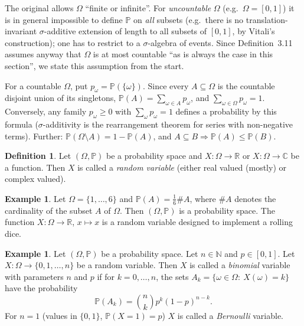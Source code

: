 \documentclass[11pt,a4paper]{article}
\numberwithin{equation}{section}
\newcommand{\N}{\mathbb{N}}
\newcommand{\R}{\mathbb{R}}
\newcommand{\C}{\mathbb{C}}
\newcommand{\PP}{\mathbb{P}}
\theoremstyle{plain}
\theoremstyle{definition}
\newtheorem{definition}[theorem]{Definition}
\newtheorem{example}[theorem]{Example}
\theoremstyle{plain}
\theoremstyle{definition}
\begin{document}
\begin{correction}[(Def.~3.1)]
The original allows $\Omega$ ``finite or infinite''. For \emph{uncountable} $\Omega$ (e.g.\
$\Omega=[0,1]$) it is in general impossible to define $\PP$ on \emph{all} subsets (e.g.\
there is no translation-invariant $\sigma$-additive extension of length to all subsets of
$[0,1]$, by Vitali's construction); one has to restrict to a $\sigma$-algebra of events.
Since Definition~3.11 assumes anyway that $\Omega$ is at most countable ``as is always the
case in this section'', we state this assumption from the start.
\end{correction}

\begin{addition}
For a countable $\Omega$, put $p_\omega=\PP(\{\omega\})$. Since every $A\subseteq\Omega$ is
the countable disjoint union of its singletons, $\PP(A)=\sum_{\omega\in A}p_\omega$, and
$\sum_{\omega\in\Omega}p_\omega=1$. Conversely, any family $p_\omega\ge0$ with
$\sum_\omega p_\omega=1$ defines a probability by this formula ($\sigma$-additivity is the
rearrangement theorem for series with non-negative terms). Further:
$\PP(\Omega\setminus A)=1-\PP(A)$, and $A\subseteq B\Rightarrow\PP(A)\le\PP(B)$.
\end{addition}

\begin{definition}
Let $(\Omega,\PP)$ be a probability space and $X:\Omega\to\R$ or $X:\Omega\to\C$ be a
function. Then $X$ is called a \emph{random variable} (either real valued (mostly) or
complex valued).
\end{definition}

\begin{example}
Let $\Omega=\{1,\dots,6\}$ and $\PP(A)=\frac16\#A$, where $\#A$ denotes the cardinality of
the subset $A$ of $\Omega$. Then $(\Omega,\PP)$ is a probability space. The function
$X:\Omega\to\R$, $x\mapsto x$ is a random variable designed to implement a rolling dice.
\end{example}

\begin{example}\label{ex:binom}
Let $(\Omega,\PP)$ be a probability space. Let $n\in\N$ and $p\in[0,1]$. Let
$X:\Omega\to\{0,1,\dots,n\}$ be a random variable. Then $X$ is called a \emph{binomial}
variable with parameters $n$ and $p$ if for $k=0,\dots,n$, the sets
$A_k=\{\omega\in\Omega:\ X(\omega)=k\}$ have the probability
\[
\PP(A_k)=\binom nkp^k(1-p)^{n-k}.
\]
For $n=1$ (values in $\{0,1\}$, $\PP(X=1)=p$) $X$ is called a \emph{Bernoulli} variable.
\end{example}
\end{document}
